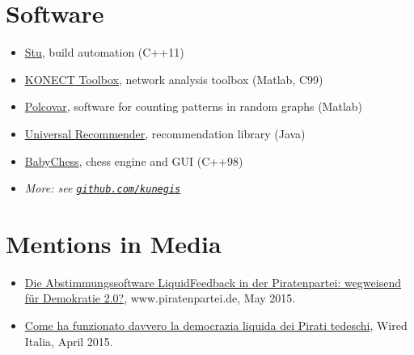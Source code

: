 \documentclass[line,mm]{res}
\newcounter{x}
\newcounter{y}
\begin{document}
\begin{resume}
\section{Software}
\begin{itemize}
  \item
    \href{https://github.com/kunegis/stu}{Stu}, build automation (C++11)
  \item 
    \href{https://github.com/kunegis/konect-toolbox}{KONECT Toolbox}, network analysis toolbox (Matlab, C99)
  \item 
    \href{https://github.com/kunegis/polcovar}{Polcovar}, software for counting patterns in random graphs (Matlab)
  \item
    \href{https://github.com/kunegis/universal-recommender}{Universal Recommender}, recommendation library (Java)
  \item
    \href{https://github.com/kunegis/babychess}{BabyChess}, chess engine and GUI (C++98)
  \item \emph{More:  see {\tt \href{https://github.com/kunegis}{github.com/kunegis}}}
\end{itemize}

\section{Mentions in Media}
\begin{itemize}
  \item
    \href{https://www.piratenpartei.de/2015/05/31/die-abstimmungssoftware-liquidfeedback-der-piratenpartei-wegweisend-fuer-demokratie-2-0/}{Die
      Abstimmungssoftware LiquidFeedback in der Piratenpartei:
      wegweisend für Demokratie 2.0?}, www.piratenpartei.de, May 2015. 
\item
  \href{http://www.wired.it/attualita/2015/04/01/come-funzionato-davvero-democrazia-liquida-dei-pirati-tedeschi/}{Come
    ha funzionato davvero la democrazia liquida dei Pirati tedeschi},
  Wired Italia, April 2015. 
\end{itemize}


\end{resume}
\end{document}

